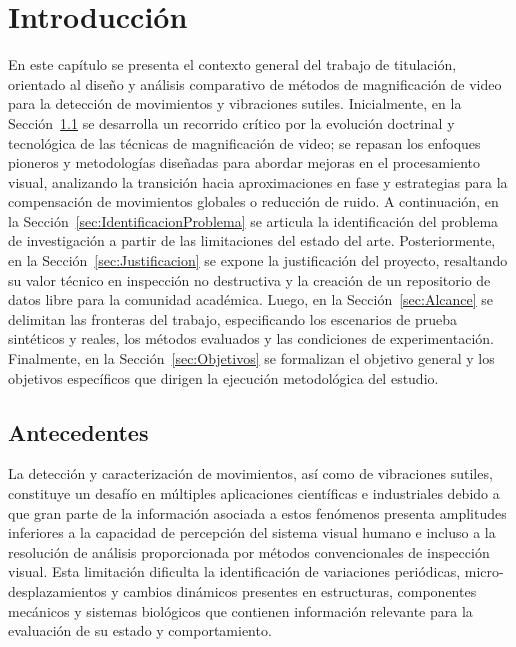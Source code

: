 ﻿\providecommand{\fig}[1]{\figurename~\ref{#1}}

\chapter{Introducción}
\glsresetall
\label{cap:Introduccion}

En este capítulo se presenta el contexto general del trabajo de titulación, orientado al diseño y análisis comparativo de métodos de magnificación de video para la detección de movimientos y vibraciones sutiles. Inicialmente, en la Sección~\ref{sec:Antecedentes} se desarrolla un recorrido crítico por la evolución doctrinal y tecnológica de las técnicas de magnificación de video; se repasan los enfoques pioneros y metodologías diseñadas para abordar mejoras en el procesamiento visual, analizando la transición hacia aproximaciones en fase y estrategias para la compensación de movimientos globales o reducción de ruido. A continuación, en la Sección~\ref{sec:IdentificacionProblema} se articula la identificación del problema de investigación a partir de las limitaciones del estado del arte. Posteriormente, en la Sección~\ref{sec:Justificacion} se expone la justificación del proyecto, resaltando su valor técnico en inspección no destructiva y la creación de un repositorio de datos libre para la comunidad académica. Luego, en la Sección~\ref{sec:Alcance} se delimitan las fronteras del trabajo, especificando los escenarios de prueba sintéticos y reales, los métodos evaluados y las condiciones de experimentación. Finalmente, en la Sección~\ref{sec:Objetivos} se formalizan el objetivo general y los objetivos específicos que dirigen la ejecución metodológica del estudio.

\section{Antecedentes}
\label{sec:Antecedentes}
La detección y caracterización de movimientos, así como de vibraciones sutiles, constituye un desafío en múltiples aplicaciones científicas e industriales debido a que gran parte de la información asociada a estos fenómenos presenta amplitudes inferiores a la capacidad de percepción del sistema visual humano e incluso a la resolución de análisis proporcionada por métodos convencionales de inspección visual. Esta limitación dificulta la identificación de variaciones periódicas, micro-desplazamientos y cambios dinámicos presentes en estructuras, componentes mecánicos y sistemas biológicos que contienen información relevante para la evaluación de su estado y comportamiento.\\


